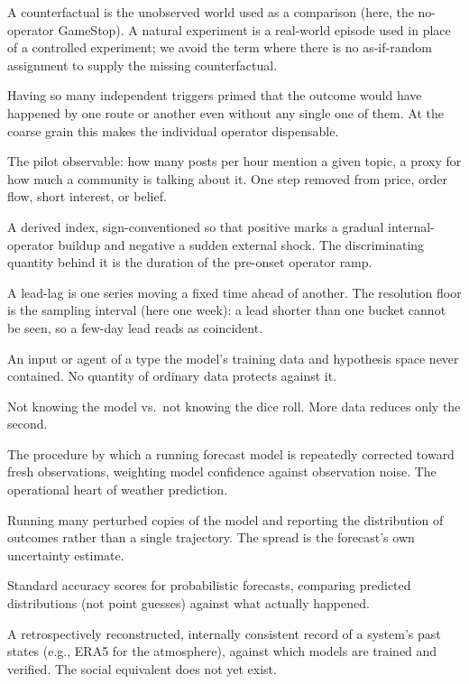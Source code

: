 \documentclass[11pt]{article}
\begin{document}
\begin{description}[itemsep=2pt,leftmargin=1.6em]
\item[Counterfactual / natural experiment] A counterfactual is the unobserved world used as a comparison (here, the no-operator GameStop). A natural experiment is a real-world episode used in place of a controlled experiment; we avoid the term where there is no as-if-random assignment to supply the missing counterfactual.
\item[Overdetermined] Having so many independent triggers primed that the outcome would have happened by one route or another even without any single one of them. At the coarse grain this makes the individual operator dispensable.
\item[Mention-density] The pilot observable: how many posts per hour mention a given topic, a proxy for how much a community is talking about it. One step removed from price, order flow, short interest, or belief.
\item[Operator-signal score] A derived index, sign-conventioned so that positive marks a gradual internal-operator buildup and negative a sudden external shock. The discriminating quantity behind it is the duration of the pre-onset operator ramp.
\item[Lead-lag / resolution floor] A lead-lag is one series moving a fixed time ahead of another. The resolution floor is the sampling interval (here one week): a lead shorter than one bucket cannot be seen, so a few-day lead reads as coincident.
\item[Out-of-distribution (OOD)] An input or agent of a type the model's training data and hypothesis space never contained. No quantity of ordinary data protects against it.
\item[Epistemic vs.\ aleatoric uncertainty] Not knowing the model vs.\ not knowing the dice roll. More data reduces only the second.
\item[Data assimilation / ensemble Kalman filter (EnKF)] The procedure by which a running forecast model is repeatedly corrected toward fresh observations, weighting model confidence against observation noise. The operational heart of weather prediction.
\item[Ensemble forecast] Running many perturbed copies of the model and reporting the distribution of outcomes rather than a single trajectory. The spread is the forecast's own uncertainty estimate.
\item[CRPS / Brier score] Standard accuracy scores for probabilistic forecasts, comparing predicted distributions (not point guesses) against what actually happened.
\item[Reanalysis] A retrospectively reconstructed, internally consistent record of a system's past states (e.g., ERA5 for the atmosphere), against which models are trained and verified. The social equivalent does not yet exist.

\end{description}
\end{document}
